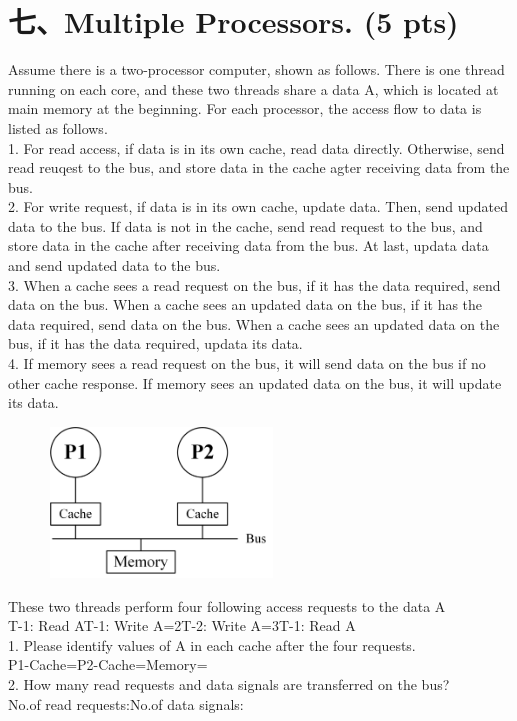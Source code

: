 \documentclass[UTF8]{ctexart}
\begin{document}
\section*{七、Multiple Processors. (5 pts)}
Assume there is a two-processor computer, shown as follows. There is one thread running on each core, and these two threads share a data A, which is located
at main memory at the beginning. For each processor, the access flow to data is listed as follows.\\
1. For read access, if data is in its own cache, read data directly. Otherwise, send read reuqest to the bus, and store data in the cache agter receiving data 
from the bus.\\
2. For write request, if data is in its own cache, update data. Then, send updated data to the bus. If data is not in the cache, send read request to the bus, 
and store data in the cache after receiving data from the bus. At last, updata data and send updated data to the bus.\\
3. When a cache sees a read request on the bus, if it has the data required, send data on the bus. When a cache sees an updated data on the bus, if it has the 
data required, send data on the bus. When a cache sees an updated data on the bus, if it has the data required, updata its data.\\
4. If memory sees a read request on the bus, it will send data on the bus if no other cache response. If memory sees an updated data on the bus, it will update 
its data.\\
\begin{figure}[H]                                            
    \centering                                                
    \includegraphics[width=6cm,height=4cm]{7.png}        
    \caption*{}                                                                                 
\end{figure}  
These two threads perform four following access requests to the data A\\
T-1: Read A\quad\quad T-1: Write A=2\quad\quad T-2: Write A=3\quad\quad T-1: Read A\\
1. Please identify values of A in each cache after the four requests.\\
P1-Cache=\quad\quad P2-Cache=\quad\quad Memory=\quad\quad\\
2. How many read requests and data signals are transferred on the bus?\\
No.of read requests:\quad\quad No.of data signals:\\
\end{document}
